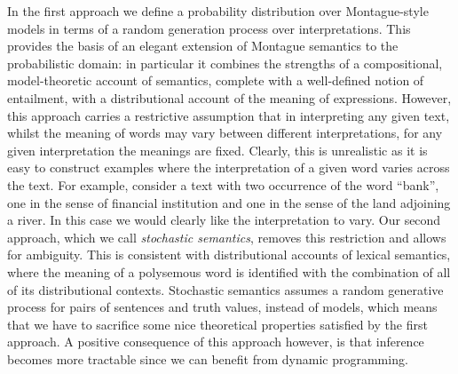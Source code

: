 \documentclass[11pt]{article}
\theoremstyle{definition}
\begin{document}

In the first approach we define a probability distribution over
Montague-style models in terms of a random generation process over
interpretations. This provides the basis of an elegant extension of
Montague semantics to the probabilistic domain: in particular it
combines the strengths of a compositional, model-theoretic account of
semantics, complete with a well-defined notion of entailment, with a
distributional account of the meaning of expressions.  However, this
approach carries a restrictive assumption that in interpreting any
given text, whilst the meaning of words may vary between different
interpretations, for any given interpretation the meanings are
fixed. Clearly, this is unrealistic as it is easy to construct
examples where the interpretation of a given word varies across the
text. For example, consider a text with two
occurrence of  the word ``bank'', one in the sense of
financial institution and one in the sense of the land adjoining a river.  In this  case we would clearly like
the interpretation to vary. Our second approach, which we call
\emph{stochastic semantics}, removes this restriction and allows for
ambiguity. This is consistent with distributional accounts of lexical
semantics, where the meaning of a polysemous word is identified with
the combination of all of its distributional contexts. Stochastic
semantics assumes a random generative process for pairs of sentences
and truth values, instead of models, which means that we have to
sacrifice some nice theoretical properties satisfied by the first
approach. A positive consequence of this approach however, is that
inference becomes more tractable since we can benefit from dynamic
programming.
\end{document}
